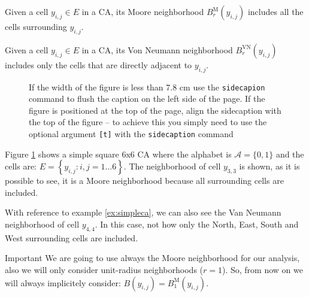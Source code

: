 \begin{definition}
\label{def:neighmoore}
Given a cell $y_{i,j} \in E$ in a CA, its Moore neighborhood $B^\text{M}_r\left( y_{i,j} \right)$
includes all the cells surrounding
$y_{i,j}$.
\end{definition}

\begin{definition}
\label{def:neighmoore}
Given a cell $y_{i,j} \in E$ in a CA, its Von Neumann neighborhood $B^\text{VN}_r\left( y_{i,j} \right)$
includes only the cells that are
directly adjacent to $y_{i,j}$.
\end{definition}

%
\begin{figure}[b]
\sidecaption

%
%
\caption{If the width of the figure is less than 7.8 cm use the \texttt{sidecapion} command to flush the caption on the left side of the page. If the figure is positioned at the top of the page, align the sidecaption with the top of the figure -- to achieve this you simply need to use the optional argument \texttt{[t]} with the \texttt{sidecaption} command}
\label{fig:exampleca}
\end{figure}
%

\begin{example}
\label{ex:simpleca}
Figure \ref{fig:exampleca} shows a simple square 6x6 CA
where the alphabet is $\mathcal{A}=\{ 0, 1 \}$ and the
cells are: $E = \left\{ y_{i,j} : i,j = 1 \dots 6 \right\}$. The neighborhood of cell $y_{3,3}$
is shown, as it is possible to see, it is a Moore neighborhood because all surrounding cells are
included.
\end{example}

\begin{example}
\label{ex:vnneigh}
With reference to example \ref{ex:simpleca}, we can also see the Van Neumann neighborhood of
cell $y_{4,4}$. In this case, not how only the North, East, South and West surrounding cells
are included.
\end{example}

\begin{important}{Important}
We are going to use always the Moore neighborhood for our analysis, also we will only consider
unit-radius neighborhoods ($r=1$). So, from now on we will always implicitely consider:
$B\left( y_{i,j} \right) = B^\text{M}_1\left( y_{i,j} \right)$.
\end{important}


